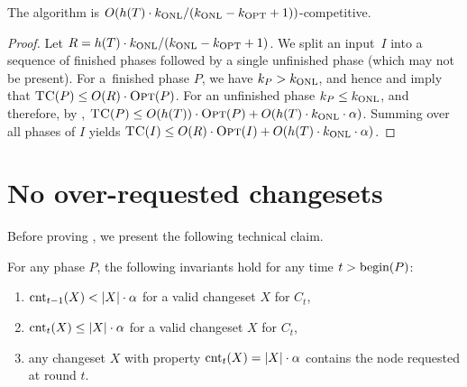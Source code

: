 \begin{theorem}
The algorithm \ALGTC is $O(h(T) \cdot k_\textnormal{ONL}/(k_\textnormal{ONL}-k_\textnormal{OPT}+1))$-competitive.
\end{theorem}

\begin{proof}
Let $R = h(T) \cdot k_\textnormal{ONL}/(k_\textnormal{ONL}-k_\textnormal{OPT}+1)$. We split an input~$I$ into a
sequence of finished phases followed by a single unfinished phase (which may
not be present). For a~finished phase $P$, we have $k_P > k_\textnormal{ONL}$, and hence
 and 
imply that $\textsc{TC}(P) \leq O(R) \cdot \textsc{Opt}(P)$. For an unfinished phase $k_P
\leq k_\textnormal{ONL}$, and therefore, by , $\textsc{TC}(P)
\leq O(h(T)) \cdot \textsc{Opt}(P) + O(h(T) \cdot k_\textnormal{ONL} \cdot \alpha)$. Summing over
all phases of $I$ yields $\textsc{TC}(I) \leq O(R) \cdot \textsc{Opt}(I) + O(h(T) \cdot k_\textnormal{ONL}
\cdot \alpha)$.
\end{proof}

\section{No over-requested changesets}
\label{sec:proof_of_lemma_1}

Before proving , 
we present the following technical claim.


\begin{claim}
\label{cla:inductive_properties}
For any phase $P$, the following invariants hold for any time $t > \textrm{begin}(P)$:
\begin{enumerate}
\item $\textrm{cnt}_{t-1}(X) < |X| \cdot \alpha$ for a valid changeset $X$ for $C_t$,\hspace{-1em}
\label{item:prop1}
\item $\textrm{cnt}_t(X) \leq |X| \cdot \alpha$ for a valid changeset $X$ for $C_t$,
\label{item:prop2}
\item any changeset $X$ with property $\textrm{cnt}_t(X) = |X| \cdot \alpha$ contains 
the node requested at round $t$.
\label{item:propmid}
\end{enumerate}
\end{claim}

